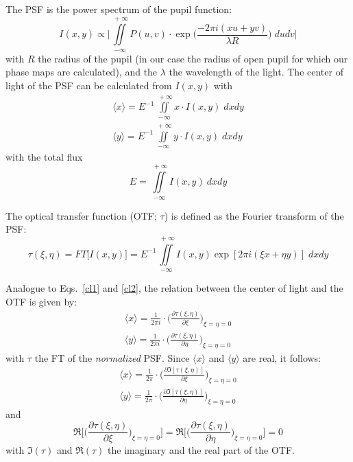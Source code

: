 \documentclass[a4paper]{article}
\begin{document}
The PSF is the power spectrum of the pupil function:
\begin{equation}
I(x,y) \propto \Big \lvert \iint\limits_{-\infty}^{\: +\infty} P(u,v) \cdot \exp\Big(\frac{-2\pi i (xu+yv)}{\lambda R}\Big)\; dudv \Big \rvert
\end{equation}
with $R$ the radius of the pupil (in our case the radius of open pupil for which our phase maps are calculated), and the $\lambda$ the wavelength of the light. The center of light of the PSF can be calculated from $I(x,y)$ with
\begin{eqnarray}
\langle x \rangle = E^{-1} \iint\limits_{-\infty}^{\: +\infty} x \cdot I(x,y) \; dxdy \label{cl1}\\
\langle y \rangle = E^{-1} \iint\limits_{-\infty}^{\: +\infty} y \cdot I(x,y) \; dxdy \label{cl2}
\end{eqnarray}
with the total flux
\begin{equation}
E = \iint\limits_{-\infty}^{\; +\infty} I(x,y) \: dxdy
\end{equation}

The optical transfer function (OTF; $\tau$) is defined as the Fourier transform of the PSF:
\begin{equation}\label{ft}
\tau(\xi,\eta) = FT\big[I(x,y)\big] = E^{-1} \iint\limits_{-\infty}^{\: +\infty} I(x,y) \exp[2 \pi i (\xi x + \eta y)] \; dxdy
\end{equation}

Analogue to Eqs.~\ref{cl1} and \ref{cl2}, the relation between the center of light and the OTF is given by:
\begin{eqnarray}
\langle x \rangle = \frac{1}{2\pi i} \cdot \Big(\frac{\partial \tau(\xi, \eta)}{\partial \xi}\Big)_{\xi = \eta = 0} \\
\langle y \rangle = \frac{1}{2\pi i} \cdot \Big(\frac{\partial \tau(\xi, \eta)}{\partial \eta}\Big)_{\xi = \eta = 0}
\end{eqnarray}
with $\tau$ the FT of the {\it normalized} PSF. Since $\langle x \rangle$ and $\langle y \rangle$ are real, it follows:
\begin{eqnarray}
\langle x \rangle = \frac{1}{2\pi} \cdot \Big(\frac{\partial \Im[\tau(\xi, \eta)]}{\partial \xi}\Big)_{\xi = \eta = 0} \\
\langle y \rangle = \frac{1}{2\pi} \cdot \Big(\frac{\partial \Im[\tau(\xi, \eta)]}{\partial \eta}\Big)_{\xi = \eta = 0}
\end{eqnarray}
and
\begin{equation}\label{con1}
\Re\Bigg[\Big(\frac{\partial \tau(\xi, \eta)}{\partial \xi}\Big)_{\xi = \eta = 0}\Bigg] = \Re\Bigg[\Big(\frac{\partial \tau(\xi, \eta)}{\partial \eta}\Big)_{\xi = \eta = 0}\Bigg] = 0
\end{equation}
with $\Im(\tau)$ and $\Re(\tau)$ the imaginary and the real part of the OTF.
\end{document}
